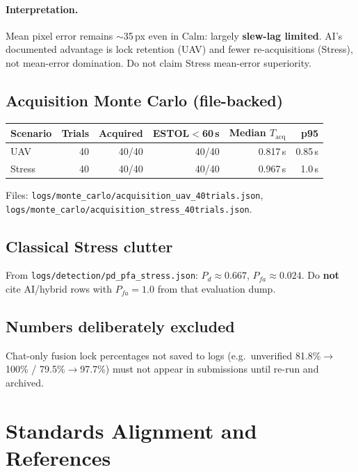 \documentclass[11pt,a4paper]{article}
\begin{document}
\paragraph{Interpretation.}
Mean pixel error remains $\sim$35\,px even in Calm: largely \textbf{slew-lag limited}.
AI's documented advantage is lock retention (UAV) and fewer re-acquisitions (Stress), not mean-error domination.
Do not claim Stress mean-error superiority.

\subsection{Acquisition Monte Carlo (file-backed)}
\begin{center}
\begin{tabular}{@{}lrrrrr@{}}
\toprule
Scenario & Trials & Acquired & ESTOL$<$60\,s & Median $T_{\mathrm{acq}}$ & p95 \\
\midrule
UAV & 40 & 40/40 & 40/40 & 0.817\,s & 0.85\,s \\
Stress & 40 & 40/40 & 40/40 & 0.967\,s & 1.0\,s \\
\bottomrule
\end{tabular}
\end{center}
Files: \texttt{logs/monte\_carlo/acquisition\_uav\_40trials.json},
\texttt{logs/monte\_carlo/acquisition\_stress\_40trials.json}.

\subsection{Classical Stress clutter}
From \texttt{logs/detection/pd\_pfa\_stress.json}:
$P_d\approx 0.667$, $P_{fa}\approx 0.024$.
Do \textbf{not} cite AI/hybrid rows with $P_{fa}=1.0$ from that evaluation dump.

\subsection{Numbers deliberately excluded}
Chat-only fusion lock percentages not saved to logs (e.g.\ unverified 81.8\%$\rightarrow$100\% / 79.5\%$\rightarrow$97.7\%) must not appear in submissions until re-run and archived.

\section{Standards Alignment and References}
\end{document}
